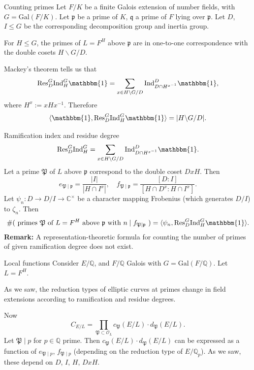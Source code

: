 \documentclass{beamer}
\newcommand{\Gal}{\mathrm{Gal}}
\newcommand{\trivial}{\mathbbm{1}}
\newcommand{\Ind}{\mathrm{Ind}}
\newcommand{\Res}{\mathrm{Res}}
\newcommand{\bQ}{\mathbb{Q}}
\newcommand{\bC}{\mathbb{C}}
\newcommand{\fP}{\mathfrak{P}}
\newcommand{\fp}{\mathfrak{p}}
\newcommand{\fq}{\mathfrak{q}}
\newcommand{\cO}{\mathcal{O}}
\theoremstyle{plain}
\begin{document}
\begin{frame}{Counting primes}
    Let $F / K$ be a finite Galois extension of number fields, with $G = \Gal(F / K)$. \pause Let $\fp$ be a prime of $K$, $\fq$ a prime of $F$ lying over $\fp$. Let $D$, $I \leq G$ be the corresponding decomposition group and inertia group. \pause 
    
    \begin{lemma}    
    For $H \leq G$, the primes of $L = F^H$ above $\fp$ are in one-to-one correspondence with the double cosets $H  \backslash G / D$. 
    \end{lemma} \pause

    \vspace{1em}
    Mackey's theorem tells us that 
    \[ \Res_D^G \Ind_H^G  \trivial = \sum_{x \in H\backslash G / D} \Ind_{D \cap H^{x^{-1}}}^D \trivial, \]
    where $H^x := x H x^{-1}$. \pause Therefore
    \[ \langle \trivial, \Res_D^G \Ind_H^G \trivial \rangle = | H \backslash G / D|.\]
\end{frame}

\begin{frame}{Ramification index and residue degree}
    \[ \Res_D^G \Ind_H^G = \sum_{x \in H\backslash G / D} \Ind_{D \cap H^{x^{-1}}}^D \trivial. \]
    Let a prime $\fP$ of $L$ above $\fp$ correspond to the double coset $D x H$. \pause Then 
    \[ e_{\fP \mid \fp} = \frac{|I|}{|H \cap I^{x}|}, \quad  f_{\fP \mid \fp} = \frac{[D : I]}{[H \cap D^{x} : H \cap I^x]}.\] \pause 
    Let $\psi_n \colon D \to D / I \to \bC^{\times}$ be a character mapping Frobenius (which generates $D/ I$) to $\zeta_n$. Then 
    \[ \# (\text{ primes $\fP$ of $L = F^H$ above $\fp$ with $n \mid f_{\fP \mid \fp}$ }) = \langle \psi_n , \Res_D^G \Ind_H^G \trivial\rangle.  \] \pause 
    \textbf{Remark:}
        A representation-theoretic formula for counting the number of primes of given ramification degree does not exist. 
\end{frame}

\begin{frame}{Local functions}
    Consider $E / \bQ$, and $F / \bQ$ Galois with $G = \Gal(F / \bQ)$. Let $L = F^H$.
    
    As we saw, the reduction types of elliptic curves at primes change in field extensions according to ramification and residue degrees.\pause 

    Now $$C_{E / L} = \prod_{\fP \subset \cO_L} c_{\fP}(E / L) \cdot d_{\fP}(E / L).$$ 
    Let $\fP \mid p$ for $p \in \bQ$ prime. \pause Then $c_{\fP}(E / L) \cdot d_{\fP}(E / L)$ can be expressed as a function of $e_{\fP \mid p}$, $f_{\fP \mid p}$ (depending on the reduction type of $E / \bQ_p$). \pause As we saw, these depend on $D$, $I$, $H$, $DxH$. 
\end{frame}
\end{document}
